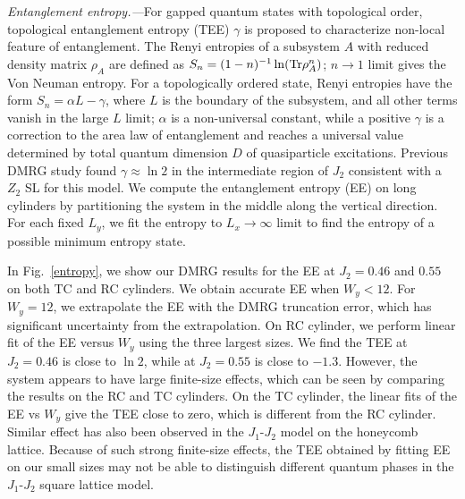 \documentclass[prl,aps,epsf,showpacs,twocolumn]{revtex4}
\begin{document}
\begin{appendices}
\textit{Entanglement entropy.---}For gapped quantum states with topological order, topological entanglement entropy (TEE) $\gamma$ is proposed to characterize non-local feature of entanglement\cite{PRL_96_110404,PRL_96_110405}. The Renyi entropies of a subsystem $A$ with reduced density matrix $\rho_A$ are defined as $S_n = (1-n)^{-1}\ln({\rm Tr}\rho_A^{n})$;
$n \rightarrow 1$ limit gives the Von Neuman entropy.  For a topologically ordered state, Renyi entropies have the form $S_n = \alpha L - \gamma$, where $L$ is the boundary of the subsystem, and all other terms vanish in the large $L$ limit; $\alpha$ is a non-universal constant, while a positive $\gamma$ is a correction to the area law of entanglement and reaches a universal value determined by total quantum dimension $D$ of quasiparticle excitations\cite{PRL_96_110404,PRL_96_110405}.
Previous DMRG study\cite{PRB_86_024424} found $\gamma \approx \ln 2$ in the intermediate region of $J_2$ consistent with a $Z_2$ SL for this model. We compute the entanglement entropy (EE) on long cylinders by partitioning the system in the middle along the vertical direction. For each fixed $L_y$, we fit the entropy to $L_x \rightarrow \infty$ limit to find the entropy of a possible minimum entropy state\cite{NP_8_902}.

In Fig.~\ref{entropy}, we show our DMRG results for the EE at $J_2 = 0.46$ and $0.55$ on both TC and RC cylinders. We obtain accurate EE when $W_y < 12$. For $W_y = 12$, we extrapolate the EE with the DMRG truncation error, which has significant uncertainty from the extrapolation.
On RC cylinder, we perform linear fit of the EE versus $W_y$ using the three largest sizes.
We find the TEE at $J_2 = 0.46$ is close to $\ln 2$, while at $J_2 = 0.55$ is close to $-1.3$. However, the system appears to have large finite-size effects, which can be seen by comparing the results on the RC and TC cylinders. On the TC cylinder, the linear fits of the EE vs $W_y$ give the TEE close to zero, which is different from the RC cylinder. 
Similar effect has also been observed in the $J_1$-$J_2$ model on the honeycomb lattice\cite{PRL_110_127205, arxiv_1306_6067}. Because of such strong finite-size effects, the TEE obtained by fitting EE on our small sizes may not be able to distinguish different quantum phases in the $J_1$-$J_2$ square lattice model.

\end{appendices}
\end{document}
